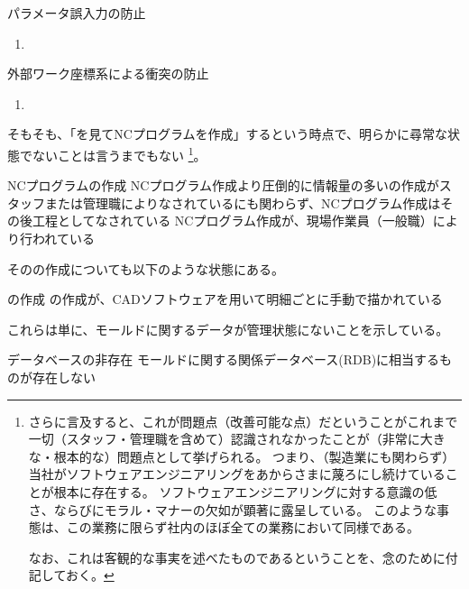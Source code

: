 \begin{Issues}{パラメータ誤入力の防止\TBW}
\begin{enumerate}[label=\sarrow]
\item[{\sarrow[red]}]
\end{enumerate}
\end{Issues}

\begin{Issues}{\KeywayMilling{} 外部ワーク座標系による衝突の防止\TBW}
\begin{enumerate}[label=\sarrow]
\item[{\sarrow[red]}]
\end{enumerate}
\end{Issues}



\clearpage
そもそも、「\nameDrawing を見てNCプログラムを作成」するという時点で、明らかに尋常な状態でないことは言うまでもない
\footnote{さらに言及すると、これが問題点（改善可能な点）だということがこれまで一切（スタッフ・管理職を含めて）認識されなかったことが（非常に大きな・根本的な）問題点として挙げられる。
つまり、（製造業にも関わらず）当社がソフトウェアエンジニアリングをあからさまに蔑ろにし続けていることが根本に存在する。
ソフトウェアエンジニアリングに対する意識の低さ、ならびにモラル・マナーの欠如が顕著に露呈している。
このような事態は、この業務に限らず社内のほぼ全ての業務において同様である。

なお、これは客観的な事実を述べたものであるということを、念のために付記しておく。}。
\begin{Issues}{NCプログラムの作成}
NCプログラム作成より圧倒的に情報量の多い\nameDrawing の作成がスタッフまたは管理職によりなされているにも関わらず、NCプログラム作成はその後工程としてなされている
\tcbline*
NCプログラム作成が、現場作業員（一般職）により行われている
\end{Issues}
その\nameDrawing の作成についても以下のような状態にある。
\begin{Issues}{\nameDrawing の作成}
\nameDrawing の作成が、CADソフトウェアを用いて明細ごとに手動で描かれている
\end{Issues}
これらは単に、モールドに関するデータが管理状態にないことを示している。
\begin{Issues}{データベースの非存在}
モールドに関する関係データベース(RDB)に相当するものが存在しない
\end{Issues}


